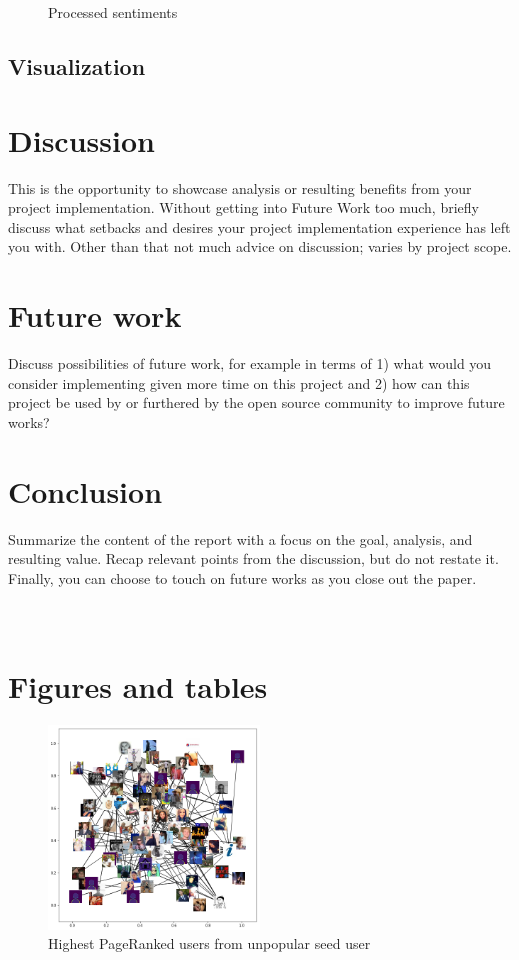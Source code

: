 \documentclass[12pt]{article}
\begin{document}
\begin{figure}[h!]
\begin{minipage}{0.45\textwidth}
        \caption{Processed sentiments}
    \end{minipage}
\end{figure}


\subsection{Visualization}

\section{Discussion}
This is the opportunity to showcase analysis or resulting benefits from your project implementation. Without getting into Future Work too much, briefly discuss what setbacks and desires your project implementation experience has left you with. Other than that not much advice on discussion; varies by project scope. 

\section{Future work}
Discuss possibilities of future work, for example in terms of 1) what would you consider implementing given more time on this project and 2) how can this project be used by or furthered by the open source community to improve future works?

\section{Conclusion}
Summarize the content of the report with a focus on the goal, analysis, and resulting value. Recap relevant points from the discussion, but do not restate it. Finally, you can choose to touch on future works as you close out the paper.

\appendix
\section{\\Figures and tables}

\begin{figure}[h!]
    \centering
     \includegraphics[width=0.5\textwidth]{nxgraph_unpopular_seed}
        \caption{Highest PageRanked users from unpopular seed user}
\end{figure}
\end{document}

